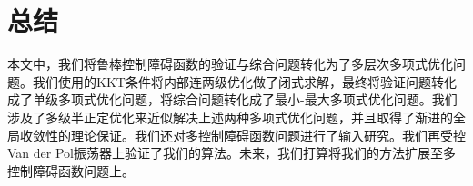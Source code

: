 
\chapter{总结}

本文中，我们将鲁棒控制障碍函数的验证与综合问题转化为了多层次多项式优化问题。我们使用的KKT条件将内部连两级优化做了闭式求解，最终将验证问题转化成了单级多项式优化问题，将综合问题转化成了最小-最大多项式优化问题。我们涉及了多级半正定优化来近似解决上述两种多项式优化问题，并且取得了渐进的全局收敛性的理论保证。我们还对多控制障碍函数问题进行了输入研究。我们再受控Van der Pol振荡器上验证了我们的算法。未来，我们打算将我们的方法扩展至多控制障碍函数问题上。